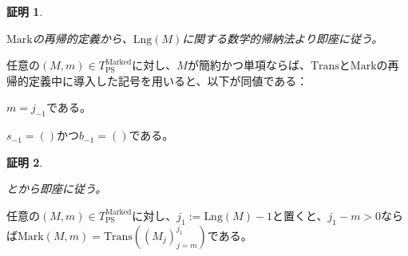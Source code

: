 \documentclass[dvipdfmx,uplatex]{jsarticle}
\theoremstyle{customnonumberbreakfortheorem}
\theoremstyle{customnonumberbreakforproof}
\newtheorem{hideableproof}{証明}
\begin{document}
\begin{hideableproof}
	\begin{indented}
		\item \(\textrm{Mark}\)の再帰的定義から、\(\textrm{Lng}(M)\)に関する数学的帰納法より即座に従う。
	\end{indented}
\end{hideableproof}

\begin{corollary}[\(s_{-1}\)と\(b_{-1}\)の空性と基点の関係]\label{s_-1とb_-1の空性と基点の関係}
	任意の\((M,m) \in T_{\textrm{PS}}^{\textrm{Marked}}\)に対し、\(M\)が簡約かつ単項ならば、\(\textrm{Trans}\)と\(\textrm{Mark}\)の再帰的定義中に導入した記号を用いると、以下が同値である：
	\begin{penumerate}
		\item \(m = j_{-1}\)である。
		\item \(s_{-1} = ()\)かつ\(b_{-1} = ()\)である。
	\end{penumerate}
\end{corollary}

\begin{hideableproof}
	\begin{indented}
		\item {}とから即座に従う。
	\end{indented}
\end{hideableproof}

\begin{proposition}\label{MarkのTransによる表示}
	任意の\((M,m) \in T_{\textrm{PS}}^{\textrm{Marked}}\)に対し、\(j_1 := \textrm{Lng}(M)-1\)と置くと、\(j_1 - m > 0\)ならば\(\textrm{Mark}(M,m) = \textrm{Trans}((M_j)_{j=m}^{j_1})\)である。
\end{proposition}
\end{document}
